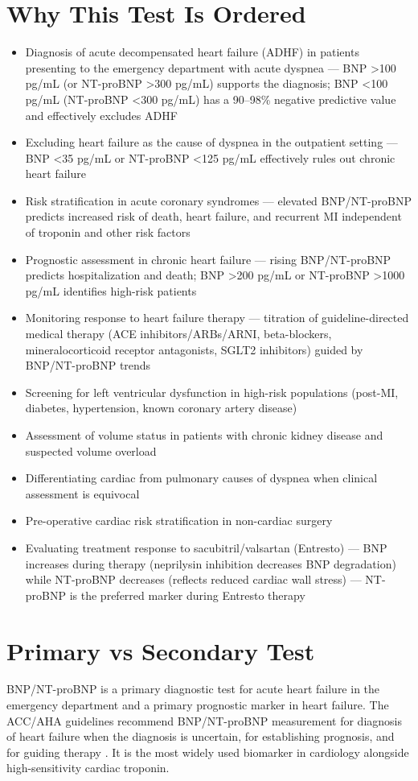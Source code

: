 \section*{Why This Test Is Ordered}
\begin{itemize}
  \item Diagnosis of acute decompensated heart failure (ADHF) in patients presenting to the emergency department with acute dyspnea --- BNP >100 pg/mL (or NT-proBNP >300 pg/mL) supports the diagnosis; BNP <100 pg/mL (NT-proBNP <300 pg/mL) has a 90--98\% negative predictive value and effectively excludes ADHF \cite{ponikowski2016esc}
  \item Excluding heart failure as the cause of dyspnea in the outpatient setting --- BNP <35 pg/mL or NT-proBNP <125 pg/mL effectively rules out chronic heart failure
  \item Risk stratification in acute coronary syndromes --- elevated BNP/NT-proBNP predicts increased risk of death, heart failure, and recurrent MI independent of troponin and other risk factors
  \item Prognostic assessment in chronic heart failure --- rising BNP/NT-proBNP predicts hospitalization and death; BNP >200 pg/mL or NT-proBNP >1000 pg/mL identifies high-risk patients
  \item Monitoring response to heart failure therapy --- titration of guideline-directed medical therapy (ACE inhibitors/ARBs/ARNI, beta-blockers, mineralocorticoid receptor antagonists, SGLT2 inhibitors) guided by BNP/NT-proBNP trends
  \item Screening for left ventricular dysfunction in high-risk populations (post-MI, diabetes, hypertension, known coronary artery disease)
  \item Assessment of volume status in patients with chronic kidney disease and suspected volume overload
  \item Differentiating cardiac from pulmonary causes of dyspnea when clinical assessment is equivocal
  \item Pre-operative cardiac risk stratification in non-cardiac surgery
  \item Evaluating treatment response to sacubitril/valsartan (Entresto) --- BNP increases during therapy (neprilysin inhibition decreases BNP degradation) while NT-proBNP decreases (reflects reduced cardiac wall stress) --- NT-proBNP is the preferred marker during Entresto therapy
\end{itemize}

\section*{Primary vs Secondary Test}
BNP/NT-proBNP is a primary diagnostic test for acute heart failure in the emergency department and a primary prognostic marker in heart failure. The ACC/AHA guidelines recommend BNP/NT-proBNP measurement for diagnosis of heart failure when the diagnosis is uncertain, for establishing prognosis, and for guiding therapy \cite{yancy2017acc}. It is the most widely used biomarker in cardiology alongside high-sensitivity cardiac troponin.

